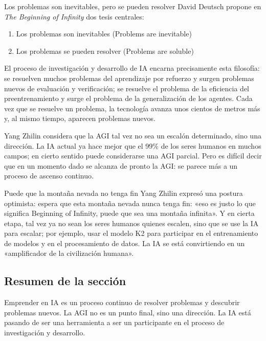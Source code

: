\documentclass[a4paper]{article}
\begin{document}
\begin{importantbox}{Los problemas son inevitables, pero se pueden resolver}
David Deutsch propone en \textit{The Beginning of Infinity} dos tesis centrales:
\begin{enumerate}
    \item Los problemas son inevitables (Problems are inevitable)
    \item Los problemas se pueden resolver (Problems are soluble)
\end{enumerate}
El proceso de investigación y desarrollo de IA encarna precisamente esta filosofía: se resuelven muchos problemas del aprendizaje por refuerzo y surgen problemas nuevos de evaluación y verificación; se resuelve el problema de la eficiencia del preentrenamiento y surge el problema de la generalización de los agentes. Cada vez que se resuelve un problema, la tecnología avanza unos cientos de metros más y, al mismo tiempo, aparecen problemas nuevos.
\end{importantbox}

Yang Zhilin considera que la AGI tal vez no sea un escalón determinado, sino una dirección. La IA actual ya hace mejor que el 99\% de los seres humanos en muchos campos; en cierto sentido puede considerarse una AGI parcial. Pero es difícil decir que en un momento dado se alcanza de pronto la AGI: se parece más a un proceso de ascenso continuo.

\begin{knowledgebox}{Puede que la montaña nevada no tenga fin}
Yang Zhilin expresó una postura optimista: espera que esta montaña nevada nunca tenga fin: «eso es justo lo que significa Beginning of Infinity, puede que sea una montaña infinita». Y en cierta etapa, tal vez ya no sean los seres humanos quienes escalen, sino que se use la IA para escalar; por ejemplo, usar el modelo K2 para participar en el entrenamiento de modelos y en el procesamiento de datos. La IA se está convirtiendo en un «amplificador de la civilización humana».
\end{knowledgebox}

\subsection{Resumen de la sección}

Emprender en IA es un proceso continuo de resolver problemas y descubrir problemas nuevos. La AGI no es un punto final, sino una dirección. La IA está pasando de ser una herramienta a ser un participante en el proceso de investigación y desarrollo.
\end{document}
